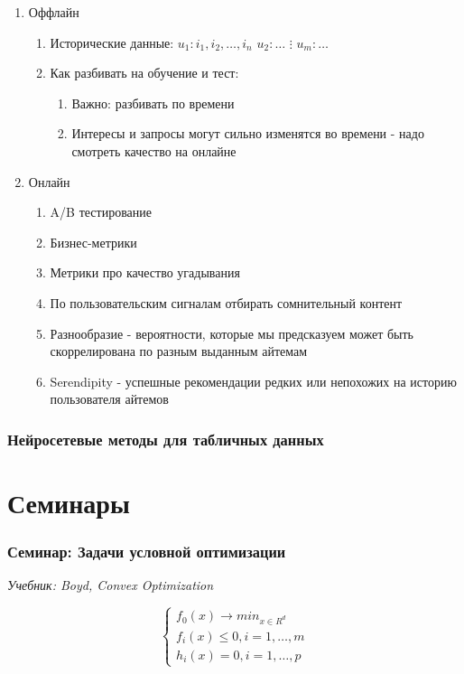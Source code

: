 \documentclass[a4paper, 12pt]{article}
\begin{document}
\begin{enumerate}
    \item Оффлайн
    \begin{enumerate}
        \item Исторические данные: 
        $u_1: i_1, i_2, \dots, i_n$
        $u_2: \dots$
        $\vdots$
        $u_m: \dots$
    \item Как разбивать на обучение и тест:
    \begin{enumerate}
        \item Важно: разбивать по времени
        \item Интересы и запросы могут сильно изменятся во времени - 
        надо смотреть качество на онлайне
    \end{enumerate}
    \end{enumerate}
    \item Онлайн
    \begin{enumerate}
        \item A/B тестирование
        \item Бизнес-метрики
        \item Метрики про качество угадывания
        \item По пользовательским сигналам отбирать сомнительный контент
        \item Разнообразие - вероятности, 
        которые мы предсказуем может быть скоррелирована 
        по разным выданным айтемам
        \item Serendipity - успешные рекомендации редких или 
        непохожих на историю пользователя айтемов
    \end{enumerate}
\end{enumerate}

\section{Нейросетевые методы для табличных данных}

\part{Семинары}
\section{Семинар: Задачи условной оптимизации}

\textit{Учебник: Boyd, Convex Optimization}

\[\begin{cases}
    f_0(x) \rightarrow min_{x \in R^d} \\
    f_i(x) \leq 0, i = 1, \ldots, m \\
    h_i(x) = 0, i = 1, \ldots, p
\end{cases}\]
\end{document}
